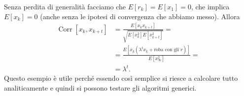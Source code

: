 \begin{solution}
    Senza perdita di generalità facciamo che $E[r_k] = E[x_1] = 0$, che implica
    $E[x_k] = 0$ (anche senza le ipotesi di convergenza che abbiamo messo).
    Allora
    \begin{align*}
        \operatorname{Corr}[x_k, x_{k+t}]
        &= \frac {E[x_k x_{k+t}]} {\sqrt{E[x_k^2] E[x_{k+t}^2]}} = \\
        &= \frac {E[x_k (\lambda^t x_k + \text{roba con gli $r$})]}
        {E[x_\infty^2]} = \\
        &= \lambda^t.
    \end{align*}
    Questo esempio è utile perché essendo così semplice si riesce a calcolare
    tutto analiticamente e quindi si possono testare gli algoritmi generici.
\end{solution}

